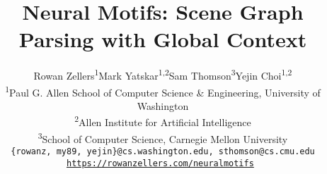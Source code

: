 \documentclass[10pt,twocolumn,letterpaper]{article}
\begin{document}
\title{\vspace{-6mm}Neural Motifs: Scene Graph Parsing with Global Context}
\author{Rowan Zellers\textsuperscript{1}\quad Mark Yatskar\textsuperscript{1,2}\quad Sam Thomson\textsuperscript{3}\quad Yejin Choi\textsuperscript{1,2}
	\\ \textsuperscript{1}Paul G. Allen School of Computer Science \& Engineering, University of Washington
	\\ \textsuperscript{2}Allen Institute for Artificial Intelligence
	\\ \textsuperscript{3}School of Computer Science, Carnegie Mellon University \vspace{-1mm}
	\\ {\tt\small \{rowanz, my89, yejin\}@cs.washington.edu, sthomson@cs.cmu.edu}
	\\ \tt\normalsize \href{https://rowanzellers.com/neuralmotifs}{https://rowanzellers.com/neuralmotifs} \vspace{-5mm}
}


\maketitle
\end{document}
